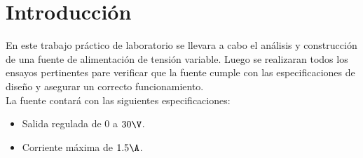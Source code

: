 \chapter{Introducción}

En este trabajo práctico de laboratorio se llevara a cabo el análisis y construcción de una
fuente de alimentación de tensión variable. Luego se realizaran todos los ensayos pertinentes
pare verificar que la fuente cumple con las especificaciones de diseño y asegurar un correcto
funcionamiento.\\

La fuente contará con las siguientes especificaciones:
\begin{itemize}
  \item Salida regulada de $0$ a $30\V$.
  \item Corriente máxima de $1.5\A$.
\end{itemize}
